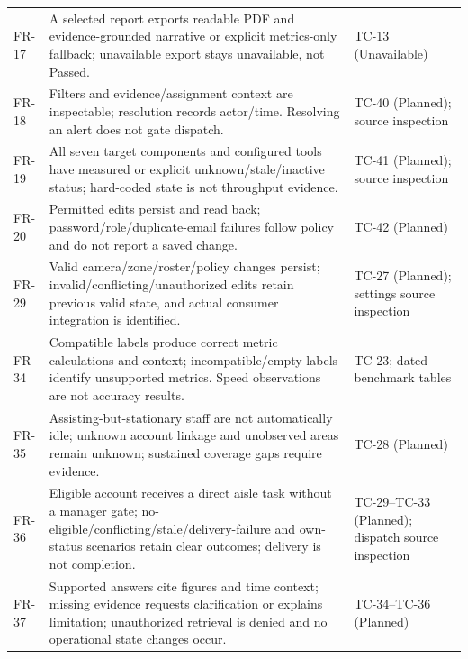 \begin{longtable}{P{0.10\textwidth}P{0.53\textwidth}P{0.27\textwidth}}
FR-17 & A selected report exports readable PDF and evidence-grounded narrative or explicit metrics-only fallback; unavailable export stays unavailable, not Passed. & TC-13 (Unavailable)\\
FR-18 & Filters and evidence/assignment context are inspectable; resolution records actor/time. Resolving an alert does not gate dispatch. & TC-40 (Planned); source inspection\\
FR-19 & All seven target components and configured tools have measured or explicit unknown/stale/inactive status; hard-coded state is not throughput evidence. & TC-41 (Planned); source inspection\\
FR-20 & Permitted edits persist and read back; password/role/duplicate-email failures follow policy and do not report a saved change. & TC-42 (Planned)\\
FR-29 & Valid camera/zone/roster/policy changes persist; invalid/conflicting/unauthorized edits retain previous valid state, and actual consumer integration is identified. & TC-27 (Planned); settings source inspection\\
FR-34 & Compatible labels produce correct metric calculations and context; incompatible/empty labels identify unsupported metrics. Speed observations are not accuracy results. & TC-23; dated benchmark tables\\
FR-35 & Assisting-but-stationary staff are not automatically idle; unknown account linkage and unobserved areas remain unknown; sustained coverage gaps require evidence. & TC-28 (Planned)\\
FR-36 & Eligible account receives a direct aisle task without a manager gate; no-eligible/conflicting/stale/delivery-failure and own-status scenarios retain clear outcomes; delivery is not completion. & TC-29--TC-33 (Planned); dispatch source inspection\\
FR-37 & Supported answers cite figures and time context; missing evidence requests clarification or explains limitation; unauthorized retrieval is denied and no operational state changes occur. & TC-34--TC-36 (Planned)\\
\bottomrule
\end{longtable}
